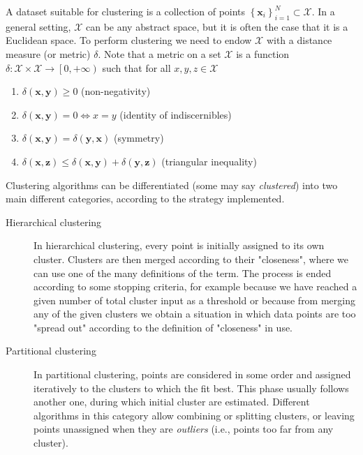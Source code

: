 \documentclass[a4paper]{article}
\begin{document}
	A dataset suitable for clustering is a collection of points $\left\{ \boldsymbol{x}_{i} \right\}_{i=1}^{N} \subset \mathcal{X}$. In a general setting, $\mathcal{X}$ can be any abstract space, but it is often the case that it is a Euclidean space. To perform clustering we need to endow $\mathcal{X}$ with a distance measure (or metric) $\delta$. Note that a metric on a set $\mathcal{X}$ is a function $\delta : \mathcal{X} \times \mathcal{X} \to \left[0,+\infty\right)$ such that for all $x, y, z \in \mathcal{X}$
	\begin{enumerate}
	\item $\delta \left( \boldsymbol{x}, \boldsymbol{y} \right)\geq 0$ (non-negativity)
	\item $\delta \left( \boldsymbol{x}, \boldsymbol{y} \right) = 0 \iff x = y$ (identity of indiscernibles)
	\item $\delta \left( \boldsymbol{x}, \boldsymbol{y} \right) = \delta \left( \boldsymbol{y}, \boldsymbol{x} \right) $ (symmetry)
	\item $ \delta \left( \boldsymbol{x}, \boldsymbol{z} \right) \leq \delta \left( \boldsymbol{x}, \boldsymbol{y} \right) + \delta \left( \boldsymbol{y}, \boldsymbol{z} \right) $ (triangular inequality)
	\end{enumerate}
	Clustering algorithms can be differentiated (some may say \textit{clustered}) into two main different categories, according to the strategy implemented.
	\begin{description}
		\item[Hierarchical clustering] In hierarchical clustering, every point is initially assigned to its own cluster. Clusters are then merged according to their "closeness", where we can use one of the many definitions of the term. The process is ended according to some stopping criteria, for example because we have reached a given number of total cluster input as a threshold or because from merging any of the given clusters we obtain a situation in which data points are too "spread out" according to the definition of "closeness" in use.
		\item[Partitional clustering] In partitional clustering, points are considered in some order and assigned iteratively to the clusters to which the fit best. This phase usually follows another one, during which initial cluster are estimated. Different algorithms in this category allow combining or splitting clusters, or leaving points unassigned when they are \textit{outliers} (i.e., points too far from any cluster).
	\end{description}
\end{document}
